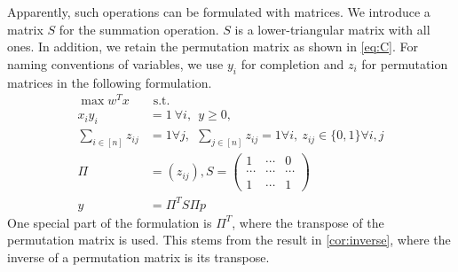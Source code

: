 \documentclass[12pt,letterpaper]{article}
\begin{document}
Apparently, such operations can be formulated with matrices. 
We introduce a matrix $S$ for the summation operation. $S$ is a lower-triangular matrix with all ones.
In addition, we retain the permutation matrix as shown in \ref{eq:C}.
For naming conventions of variables, we use $y_i$ for completion and $z_i$ for permutation matrices 
in the following formulation.
\begin{align*}
    \max w^Tx& \text{ s.t. } \label{eq:D} \tag{D} \\
 x_i y_i &= 1 \ \forall i, \ \ y \geq 0, \\ 
    \sum_{i \in [n]} z_{ij} &= 1 \forall j,  \ \ 
    \sum_{j \in [n]} z_{ij} = 1 \forall i,  \ z_{ij} \in \{0, 1\} \forall i, j \\ 
    \Pi &= (z_{ij}), S = \begin{pmatrix}
        1 & \cdots & 0 \\ 
        \cdots & \cdots & \cdots \\ 
        1 & \cdots & 1
    \end{pmatrix} \\
 y &= \Pi^T S \Pi p 
\end{align*}
One special part of the formulation is $\Pi^T$, where the transpose 
of the permutation matrix is used. This stems from the result in \ref{cor:inverse},
where the inverse of a permutation matrix is its transpose.
\end{document}
